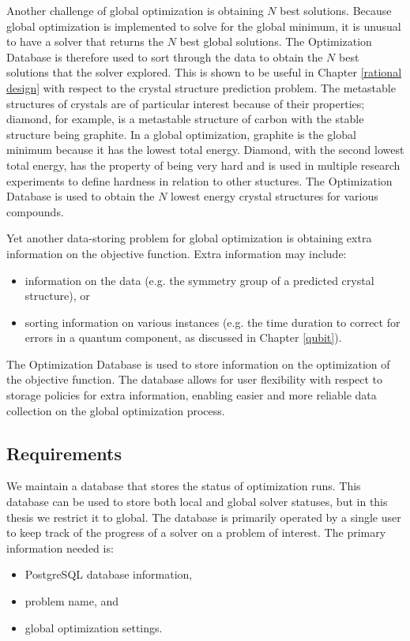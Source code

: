 Another challenge of global optimization is obtaining $N$ best solutions. Because global optimization is implemented to solve for the global minimum, it is unusual to have a solver that returns the $N$ best global solutions. The Optimization Database is therefore used to sort through the data to obtain the $N$ best solutions that the solver explored. This is shown to be useful in Chapter \ref{rational design} with respect to the crystal structure prediction problem. The metastable structures of crystals are of particular interest because of their properties; diamond, for example, is a metastable structure of carbon with the stable structure being graphite. In a global optimization, graphite is the global minimum because it has the lowest total energy. Diamond, with the second lowest total energy, has the property of being very hard and is used in multiple research experiments to define hardness in relation to other stuctures. The Optimization Database is used to obtain the $N$ lowest energy crystal structures for various compounds. 


Yet another data-storing problem for global optimization is obtaining extra information on the objective function. Extra information may include:
\begin{itemize}
    \item information on the data (e.g. the symmetry group of a predicted crystal structure), or
    \item sorting information on various instances (e.g. the time duration to correct for errors in a quantum component, as discussed in Chapter \ref{qubit}).
\end{itemize}
The Optimization Database is used to store information on the optimization of the objective function. The database allows for user flexibility with respect to storage policies for extra information, enabling easier and more reliable data collection on the global optimization process. 

\subsection{Requirements}

We maintain a database that stores the status of optimization runs. This database can be used to store both local and global solver statuses, but in this thesis we restrict it to global. The database is primarily operated by a single user to keep track of the progress of a solver on a problem of interest. The primary information needed is:
\begin{itemize}
    \item PostgreSQL database information, 
    \item problem name, and 
    \item global optimization settings.
\end{itemize}

